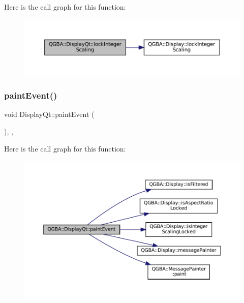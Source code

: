 Here is the call graph for this function\+:
\nopagebreak
\begin{figure}[H]
\begin{center}
\leavevmode
\includegraphics[width=350pt]{class_q_g_b_a_1_1_display_qt_afc071d5977e2451415f2f47689cdd350_cgraph}
\end{center}
\end{figure}
\mbox{\label{class_q_g_b_a_1_1_display_qt_a3482e78bcc3c93340cf364ffe57ffa8a}} 
\subsubsection{\texorpdfstring{paint\+Event()}{paintEvent()}}
{\footnotesize\ttfamily void Display\+Qt\+::paint\+Event (\begin{DoxyParamCaption}\item[{Q\+Paint\+Event $\ast$}]{ }\end{DoxyParamCaption})\hspace{0.3cm}{\ttfamily [override]}, {\ttfamily [protected]}, {\ttfamily [virtual]}}

Here is the call graph for this function\+:
\nopagebreak
\begin{figure}[H]
\begin{center}
\leavevmode
\includegraphics[width=350pt]{class_q_g_b_a_1_1_display_qt_a3482e78bcc3c93340cf364ffe57ffa8a_cgraph}
\end{center}
\end{figure}
\mbox{\label{class_q_g_b_a_1_1_display_qt_ab214828ae75e0b06543da51056ec751d}} 
